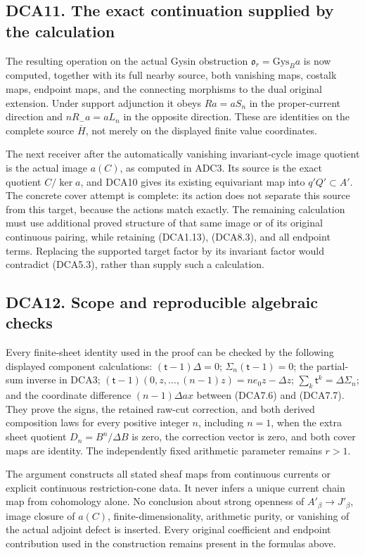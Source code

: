 \subsection{DCA11. The exact continuation supplied by the
calculation}\label{dca11.-the-exact-continuation-supplied-by-the-calculation}

The resulting operation on the actual Gysin obstruction
\(\mathfrak o_r=\mathrm{Gys}_Ba\) is now computed, together with its
full nearby source, both vanishing maps, costalk maps, endpoint maps,
and the connecting morphisms to the dual original extension. Under
support adjunction it obeys \(Ra=aS_n\) in the proper-current direction
and \(nR_-a=aL_n\) in the opposite direction. These are identities on
the complete source \(\overline H\), not merely on the displayed finite
value coordinates.

The next receiver after the automatically vanishing invariant-cycle
image quotient is the actual image \(a(C)\), as computed in ADC3. Its
source is the exact quotient \(C/\ker a\), and DCA10 gives its existing
equivariant map into \(q'Q'\subset A'\). The concrete cover attempt is
complete: its action does not separate this source from this target,
because the actions match exactly. The remaining calculation must use
additional proved structure of that same image or of its original
continuous pairing, while retaining (DCA1.13), (DCA8.3), and all
endpoint terms. Replacing the supported target factor by its invariant
factor would contradict (DCA5.3), rather than supply such a calculation.

\subsection{DCA12. Scope and reproducible algebraic
checks}\label{dca12.-scope-and-reproducible-algebraic-checks}

Every finite-sheet identity used in the proof can be checked by the
following displayed component calculations: \((\mathsf t-1)\Delta=0\);
\(\Sigma_n(\mathsf t-1)=0\); the partial-sum inverse in DCA3;
\((\mathsf t-1)(0,z,\ldots,(n-1)z)=ne_0z-\Delta z\);
\(\sum_k\mathsf t^k=\Delta\Sigma_n\); and the coordinate difference
\((n-1)\Delta ax\) between (DCA7.6) and (DCA7.7). They prove the signs,
the retained raw-cut correction, and both derived composition laws for
every positive integer \(n\), including \(n=1\), when the extra sheet
quotient \(D_n=B^n/\Delta B\) is zero, the correction vector is zero,
and both cover maps are identity. The independently fixed arithmetic
parameter remains \(r>1\).

The argument constructs all stated sheaf maps from continuous currents
or explicit continuous restriction-cone data. It never infers a unique
current chain map from cohomology alone. No conclusion about strong
openness of \(A'_\beta\to J'_\beta\), image closure of \(a(C)\),
finite-dimensionality, arithmetic purity, or vanishing of the actual
adjoint defect is inserted. Every original coefficient and endpoint
contribution used in the construction remains present in the formulas
above.
